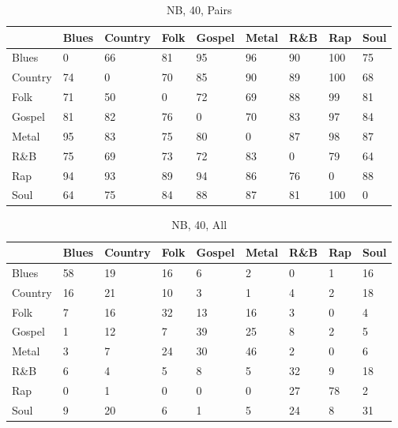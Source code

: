 \documentclass[a4paper,oneside]{article}
\begin{document}
\begin{table}[H]\centering
\caption{NB, 40, Pairs}
\begin{tabu}{l|*{8}{l}}
 & Blues & Country & Folk & Gospel & Metal & R\&B & Rap & Soul \\ \hline
Blues & 0 & 66 & 81 & 95 & 96 & 90 & 100 & 75 \\
Country & 74 & 0 & 70 & 85 & 90 & 89 & 100 & 68 \\
Folk & 71 & 50 & 0 & 72 & 69 & 88 & 99 & 81 \\
Gospel & 81 & 82 & 76 & 0 & 70 & 83 & 97 & 84 \\
Metal & 95 & 83 & 75 & 80 & 0 & 87 & 98 & 87 \\
R\&B & 75 & 69 & 73 & 72 & 83 & 0 & 79 & 64 \\
Rap & 94 & 93 & 89 & 94 & 86 & 76 & 0 & 88 \\
Soul & 64 & 75 & 84 & 88 & 87 & 81 & 100 & 0 \\
\end{tabu}
\end{table}

\begin{table}[H]\centering
\caption{NB, 40, All}
\begin{tabu}{l|*{8}{l}}
 & Blues & Country & Folk & Gospel & Metal & R\&B & Rap & Soul \\ \hline
Blues & 58 & 19 & 16 & 6 & 2 & 0 & 1 & 16 \\
Country & 16 & 21 & 10 & 3 & 1 & 4 & 2 & 18 \\
Folk & 7 & 16 & 32 & 13 & 16 & 3 & 0 & 4 \\
Gospel & 1 & 12 & 7 & 39 & 25 & 8 & 2 & 5 \\
Metal & 3 & 7 & 24 & 30 & 46 & 2 & 0 & 6 \\
R\&B & 6 & 4 & 5 & 8 & 5 & 32 & 9 & 18 \\
Rap & 0 & 1 & 0 & 0 & 0 & 27 & 78 & 2 \\
Soul & 9 & 20 & 6 & 1 & 5 & 24 & 8 & 31 \\
\end{tabu}
\end{table}
\end{document}
